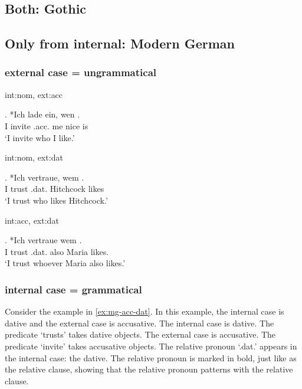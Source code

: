 \subsection{Both: Gothic}






\subsection{Only from internal: Modern German}

\subsubsection{external case = ungrammatical}

\ac{int}:\ac{nom}, \ac{ext}:\ac{acc}

\exg. *Ich {lade ein}, wen   .\\
 I invite\scsub{[acc]} .\ac{acc}. me nice is\scsub{[nom]}\\
 `I invite who I like.' 

\ac{int}:\ac{nom}, \ac{ext}:\ac{dat}

\exg. *Ich vertraue, wem  .\\
 I trust\scsub{[dat]} .\ac{dat}. Hitchcock likes\scsub{[nom]}\\
 `I trust who likes Hitchcock.' 

\ac{int}:\ac{acc}, \ac{ext}:\ac{dat}

\exg. *Ich vertraue wem   . \\
 I trust\scsub{[dat]} .\ac{dat}. also Maria likes\scsub{[acc]}.\\
 `I trust whoever Maria also likes.' 



\subsubsection{internal case = grammatical}

Consider the example in \ref{ex:mg-acc-dat}. In this example, the internal case is dative and the external case is accusative.
The internal case is dative. The predicate  `trusts' takes dative objects.
The external case is accusative. The predicate  `invite' takes accusative objects.
The relative pronoun  `.\ac{dat}.' appears in the internal case: the dative. The relative pronoun is marked in bold, just like as the relative clause, showing that the relative pronoun patterns with the relative clause.

